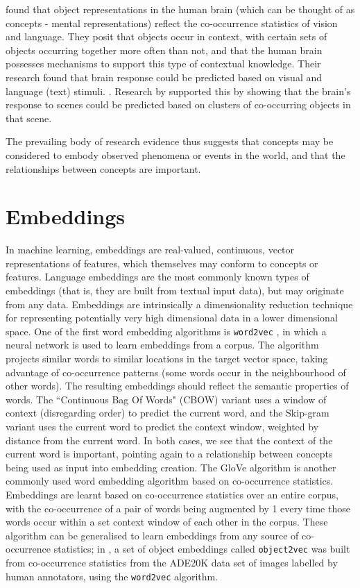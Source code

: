 \cite{CoocurrenceVisionLanguage2021} found that object representations in the human brain (which can be thought of as concepts - mental representations) reflect the co-occurrence statistics of vision and language. They posit that objects occur in context, with certain sets of objects occurring together more often than not, and that the human brain possesses mechanisms to support this type of contextual knowledge. Their research found that brain response could be predicted based on visual and language (text) stimuli. . Research by \cite{STANSBURY20131025} supported this by showing that the brain's response to scenes could be predicted based on clusters of co-occurring objects in that scene. 

The prevailing body of research evidence thus suggests that concepts may be considered to embody observed phenomena or events in the world, and that the relationships between concepts are important. 

\section{Embeddings}

In machine learning, embeddings are real-valued, continuous, vector representations of features, which themselves may conform to concepts or features. Language embeddings are the most commonly known types of embeddings (that is, they are built from textual input data), but may originate from any data. Embeddings are intrinsically a dimensionality reduction technique for representing potentially very high dimensional data in a lower dimensional space. One of the first word embedding algorithms is \texttt{word2vec} \cite{word2vec}, in which a neural network is used to learn embeddings from a corpus. The algorithm projects similar words to similar locations in the target vector space, taking advantage of co-occurrence patterns (some words occur in the neighbourhood of other words). The resulting embeddings should reflect the semantic properties of words. The ``Continuous Bag Of Words" (CBOW) variant uses a window of context (disregarding order) to predict the current word, and the Skip-gram variant uses the current word to predict the context window, weighted by distance from the current word. In both cases, we see that the context of the current word is important, pointing again to a relationship between concepts being used as input into embedding creation. The GloVe \cite{pennington2014glove} algorithm is another commonly used word embedding algorithm based on co-occurrence statistics. Embeddings are learnt based on co-occurrence statistics over an entire corpus, with the co-occurrence of a pair of words being augmented by 1 every time those words occur within a set context window of each other in the corpus. These algorithm can be generalised to learn embeddings from any source of co-occurrence statistics; in \cite{CoocurrenceVisionLanguage2021}, a set of object embeddings called \texttt{object2vec} was built from co-occurrence statistics from the ADE20K data set  of images labelled by human annotators, using the \texttt{word2vec} algorithm. 


